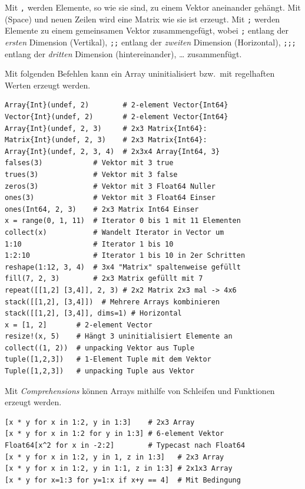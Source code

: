 \documentclass[10pt,twocolumn]{scrartcl}
\begin{document}
Mit \lstinline|,| werden Elemente, so wie sie sind, zu einem Vektor aneinander
gehängt. Mit \lstinline| | (Space) und neuen Zeilen wird eine Matrix wie sie ist
erzeugt. Mit \lstinline|;| werden Elemente zu einem gemeinsamen Vektor
zusammengefügt, wobei \lstinline|;| entlang der \emph{ersten} Dimension
(Vertikal), \lstinline|;;| entlang der \emph{zweiten} Dimension (Horizontal),
\lstinline|;;;| entlang der \emph{dritten} Dimension (hintereinander), \dots
zusammenfügt.

Mit folgenden Befehlen kann ein Array uninitialisiert bzw.\ mit regelhaften
Werten erzeugt werden.

\begin{lstlisting}
Array{Int}(undef, 2)        # 2-element Vector{Int64}
Vector{Int}(undef, 2)       # 2-element Vector{Int64}
Array{Int}(undef, 2, 3)     # 2x3 Matrix{Int64}:
Matrix{Int}(undef, 2, 3)    # 2x3 Matrix{Int64}:
Array{Int}(undef, 2, 3, 4)  # 2x3x4 Array{Int64, 3}
falses(3)            # Vektor mit 3 true
trues(3)             # Vektor mit 3 false
zeros(3)             # Vektor mit 3 Float64 Nuller
ones(3)              # Vektor mit 3 Float64 Einser
ones(Int64, 2, 3)    # 2x3 Matrix Int64 Einser
x = range(0, 1, 11)  # Iterator 0 bis 1 mit 11 Elementen
collect(x)           # Wandelt Iterator in Vector um
1:10                 # Iterator 1 bis 10
1:2:10               # Iterator 1 bis 10 in 2er Schritten
reshape(1:12, 3, 4)  # 3x4 "Matrix" spaltenweise gefüllt
fill(7, 2, 3)        # 2x3 Matrix gefüllt mit 7
repeat([[1,2] [3,4]], 2, 3) # 2x2 Matrix 2x3 mal -> 4x6
stack([[1,2], [3,4]])  # Mehrere Arrays kombinieren
stack([[1,2], [3,4]], dims=1) # Horizontal
x = [1, 2]       # 2-element Vector
resize!(x, 5)    # Hängt 3 uninitialisiert Elemente an
collect((1, 2))  # unpacking Vektor aus Tuple
tuple([1,2,3])   # 1-Element Tuple mit dem Vektor
Tuple([1,2,3])   # unpacking Tuple aus Vektor
\end{lstlisting}

Mit \emph{Comprehensions} können Arrays mithilfe von Schleifen und Funktionen erzeugt werden.

\begin{lstlisting}
[x * y for x in 1:2, y in 1:3]    # 2x3 Array
[x * y for x in 1:2 for y in 1:3] # 6-element Vektor
Float64[x^2 for x in -2:2]        # Typecast nach Float64
[x * y for x in 1:2, y in 1, z in 1:3]   # 2x3 Array
[x * y for x in 1:2, y in 1:1, z in 1:3] # 2x1x3 Array
[x * y for x=1:3 for y=1:x if x+y == 4]  # Mit Bedingung
\end{lstlisting}
\end{document}
